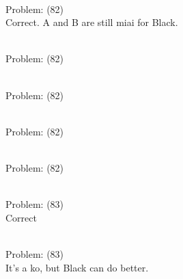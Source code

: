 \documentclass[11pt]{article}
\begin{document}
\begin{minipage}[t]{0.5\textwidth}
  {\centering
  
\\
Problem: (82)\\
Correct. A and B are still miai for Black.\\
  }
\end{minipage}
\begin{minipage}[t]{0.5\textwidth}
  {\centering
  
\\
Problem: (82)\\
  }
\end{minipage}
\begin{minipage}[t]{0.5\textwidth}
  {\centering
  
\\
Problem: (82)\\
  }
\end{minipage}
\begin{minipage}[t]{0.5\textwidth}
  {\centering
  
\\
Problem: (82)\\
  }
\end{minipage}
\begin{minipage}[t]{0.5\textwidth}
  {\centering
  
\\
Problem: (82)\\
  }
\end{minipage}
\begin{minipage}[t]{0.5\textwidth}
  {\centering
  
\\
Problem: (83)\\
Correct\\
  }
\end{minipage}
\begin{minipage}[t]{0.5\textwidth}
  {\centering
  
\\
Problem: (83)\\
It's a ko, but Black can do better.\\
  }
\end{minipage}
\end{document}
